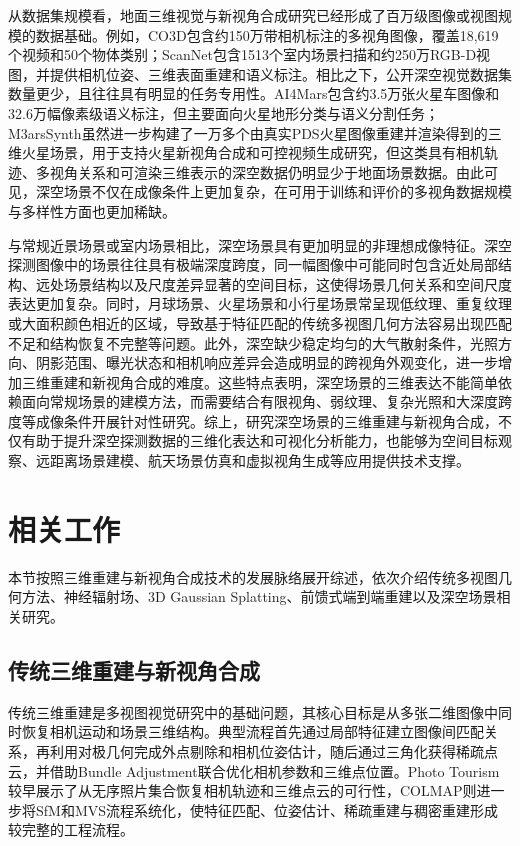 从数据集规模看，地面三维视觉与新视角合成研究已经形成了百万级图像或视图规模的数据基础。例如，CO3D包含约150万带相机标注的多视角图像，覆盖18,619个视频和50个物体类别；ScanNet包含1513个室内场景扫描和约250万RGB-D视图，并提供相机位姿、三维表面重建和语义标注。相比之下，公开深空视觉数据集数量更少，且往往具有明显的任务专用性。AI4Mars包含约3.5万张火星车图像和32.6万幅像素级语义标注，但主要面向火星地形分类与语义分割任务；M3arsSynth虽然进一步构建了一万多个由真实PDS火星图像重建并渲染得到的三维火星场景，用于支持火星新视角合成和可控视频生成研究，但这类具有相机轨迹、多视角关系和可渲染三维表示的深空数据仍明显少于地面场景数据。由此可见，深空场景不仅在成像条件上更加复杂，在可用于训练和评价的多视角数据规模与多样性方面也更加稀缺。

与常规近景场景或室内场景相比，深空场景具有更加明显的非理想成像特征。深空探测图像中的场景往往具有极端深度跨度，同一幅图像中可能同时包含近处局部结构、远处场景结构以及尺度差异显著的空间目标，这使得场景几何关系和空间尺度表达更加复杂。同时，月球场景、火星场景和小行星场景常呈现低纹理、重复纹理或大面积颜色相近的区域，导致基于特征匹配的传统多视图几何方法容易出现匹配不足和结构恢复不完整等问题。此外，深空缺少稳定均匀的大气散射条件，光照方向、阴影范围、曝光状态和相机响应差异会造成明显的跨视角外观变化，进一步增加三维重建和新视角合成的难度。这些特点表明，深空场景的三维表达不能简单依赖面向常规场景的建模方法，而需要结合有限视角、弱纹理、复杂光照和大深度跨度等成像条件开展针对性研究。综上，研究深空场景的三维重建与新视角合成，不仅有助于提升深空探测数据的三维化表达和可视化分析能力，也能够为空间目标观察、远距离场景建模、航天场景仿真和虚拟视角生成等应用提供技术支撑。


\section{相关工作}
本节按照三维重建与新视角合成技术的发展脉络展开综述，依次介绍传统多视图几何方法、神经辐射场、3D Gaussian Splatting、前馈式端到端重建以及深空场景相关研究。

\subsection{传统三维重建与新视角合成}
传统三维重建是多视图视觉研究中的基础问题，其核心目标是从多张二维图像中同时恢复相机运动和场景三维结构。典型流程首先通过局部特征建立图像间匹配关系，再利用对极几何完成外点剔除和相机位姿估计，随后通过三角化获得稀疏点云，并借助Bundle Adjustment联合优化相机参数和三维点位置。Photo Tourism较早展示了从无序照片集合恢复相机轨迹和三维点云的可行性，COLMAP则进一步将SfM和MVS流程系统化，使特征匹配、位姿估计、稀疏重建与稠密重建形成较完整的工程流程。

